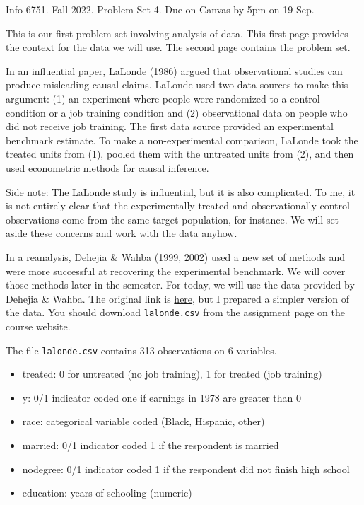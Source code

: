 \documentclass[10pt]{article}
\begin{document}
\begin{Large} 
Info 6751. Fall 2022. Problem Set 4. Due on Canvas by 5pm on 19 Sep.
\end{Large}
\hline

This is our first problem set involving analysis of data. This first page provides the context for the data we will use. The second page contains the problem set.

In an influential paper, \href{https://www.jstor.org/stable/1806062}{LaLonde (1986)} argued that observational studies can produce misleading causal claims. LaLonde used two data sources to make this argument: (1) an experiment where people were randomized to a control condition or a job training condition and (2) observational data on people who did not receive job training. The first data source provided an experimental benchmark estimate. To make a non-experimental comparison, LaLonde took the treated units from (1), pooled them with the untreated units from (2), and then used econometric methods for causal inference.

Side note: The LaLonde study is influential, but it is also complicated. To me, it is not entirely clear that the experimentally-treated and observationally-control observations come from the same target population, for instance. We will set aside these concerns and work with the data anyhow.

In a reanalysis, Dehejia \& Wahba (\href{https://www.tandfonline.com/doi/abs/10.1080/01621459.1999.10473858}{1999}, \href{https://doi.org/10.1162/003465302317331982}{2002}) used a new set of methods and were more successful at recovering the experimental benchmark. We will cover those methods later in the semester. For today, we will use the data provided by Dehejia \& Wahba. The original link is \href{https://users.nber.org/~rdehejia/nswdata2.html}{here}, but I prepared a simpler version of the data. You should download \texttt{lalonde.csv} from the assignment page on the course website.

The file \texttt{lalonde.csv} contains 313 observations on 6 variables.
\begin{itemize}
    \item treated: 0 for untreated (no job training), 1 for treated (job training)
    \item y: 0/1 indicator coded one if earnings in 1978 are greater than 0
    \item race: categorical variable coded (Black, Hispanic, other)
    \item married: 0/1 indicator coded 1 if the respondent is married
    \item nodegree: 0/1 indicator coded 1 if the respondent did not finish high school
    \item education: years of schooling (numeric)
\end{itemize}
\end{document}
